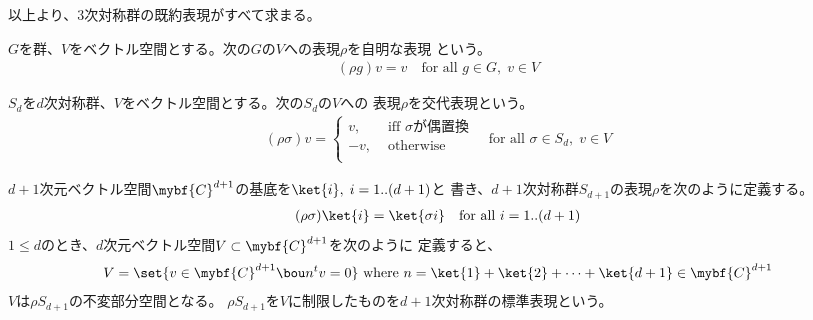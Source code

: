 	以上より、$3$次対称群の既約表現がすべて求まる。

	\begin{definition}[自明な表現]\label{def:自明な表現} %
		$G$を群、$V$をベクトル空間とする。次の$G$の$V$への表現$\rho$を自明な表現
		という。
		\begin{equation*}\begin{split} %
			(\rho g)v = v \quad\text{for all }g\in G,\;v\in V
		\end{split}\end{equation*} %
	\end{definition} %

	\begin{definition}[交代表現]\label{def:交代表現} %
		$S_d$を$d$次対称群、$V$をベクトル空間とする。次の$S_d$の$V$への
		表現$\rho$を交代表現という。
		\begin{equation*}\begin{split} %
			(\rho \sigma)v = \begin{cases}
				v, &\text{ iff }\sigma \text{が偶置換} \\
				-v, &\text{ otherwise } \\
			\end{cases} \quad\text{for all }\sigma\in S_d,\;v\in V
		\end{split}\end{equation*} %
	\end{definition} %

	\begin{definition}[対称群の標準表現]\label{def:対称群の標準表現} %
		$d+1$次元ベクトル空間$\mybf{C}^{d+1}$の基底を$\ket{i},\;i=1..(d+1)$と
		書き、$d+1$次対称群$S_{d+1}$の表現$\rho$を次のように定義する。
		\begin{equation*}\begin{split} %
			(\rho\sigma)\ket{i} = \ket{\sigma i}\quad\text{for all }i=1..(d+1)
		\end{split}\end{equation*} %
		$1\le d$のとき、$d$次元ベクトル空間$V\subset \mybf{C}^{d+1}$を次のように
		定義すると、
		\begin{equation*}\begin{split} %
			V = \set{v\in \mybf{C}^{d+1}\bou n^tv=0} \text{ where }
			n = \ket{1}+\ket{2}+\cdots+\ket{d+1}\in\mybf{C}^{d+1}
		\end{split}\end{equation*} %
		$V$は$\rho S_{d+1}$の不変部分空間となる。
		$\rho S_{d+1}$を$V$に制限したものを$d+1$次対称群の標準表現という。
	\end{definition} %

